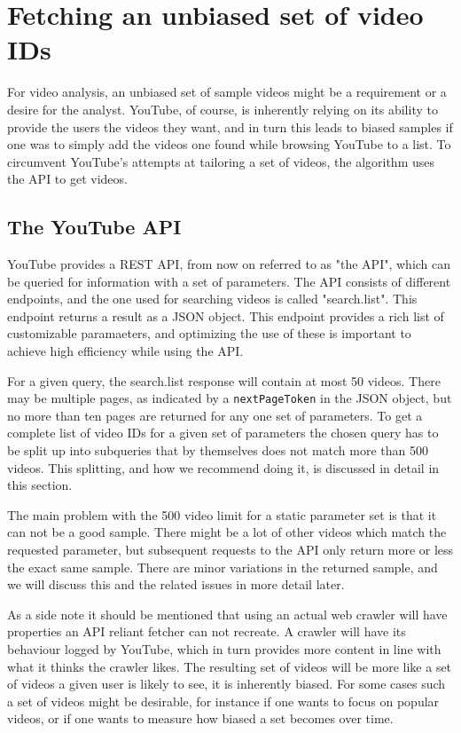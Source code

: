 \section{Fetching an unbiased set of video IDs}
For video analysis, an unbiased set of sample videos might be a requirement or
a desire for the analyst. YouTube, of course, is inherently relying on its
ability to provide the users the videos they want, and in turn this leads to
biased samples if one was to simply add the videos one found while
browsing YouTube to a list. To circumvent YouTube's attempts at tailoring a set
of videos, the algorithm uses the API to get videos.

\subsection{The YouTube API}
YouTube provides a REST API, from now on referred to as "the API", which can be
queried for information with a set of parameters. The API consists of different
endpoints, and the one used for searching videos is called "search.list". This
endpoint returns a result as a JSON object. This endpoint provides a rich list
of customizable paramaeters, and optimizing the use of these is important to
achieve high efficiency while using the API. 

For a given query, the search.list response will contain at most 50 videos. There
may be multiple pages, as indicated by a \texttt{nextPageToken} in the JSON
object, but no more than ten pages are returned for any one set of parameters.
To get a complete list of video IDs for a given set of parameters the chosen
query has to be split up into subqueries that by themselves does not match more
than 500 videos. This splitting, and how we recommend doing it, is discussed in
detail in this section.

The main problem with
the 500 video limit for a static parameter set is that it can not be a good
sample. There might be a lot of other videos which match the requested
parameter, but subsequent requests to the API only return more or less the exact
same sample. There are minor variations in the returned sample, and we will 
discuss this and the related issues in more detail later. 

As a side note it should be mentioned that using an actual web crawler will have
properties an API reliant fetcher can not recreate. A crawler will have its 
behaviour logged by YouTube, which in turn provides more content in line with
what it thinks the crawler likes. The resulting set of videos will be more like
a set of videos a given user is likely to see, it is inherently biased. For some
cases such a set of videos might be desirable, for instance if one wants to
focus on popular videos, or if one wants to measure how biased a set becomes
over time.

